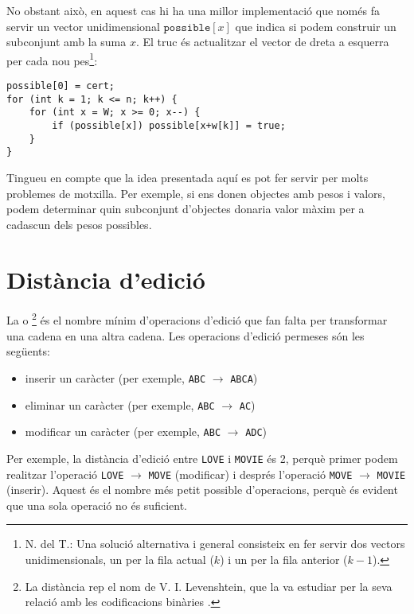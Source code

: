 No obstant això, en aquest cas
hi ha una millor implementació que només fa servir
un vector unidimensional $\texttt{possible}[x]$
que indica si podem construir un subconjunt amb la suma $x$.
El truc és actualitzar el vector de dreta a esquerra
per cada nou pes\footnote{N. del T.: Una solució alternativa i general consisteix
en fer servir dos vectors unidimensionals, un per la fila actual ($k$) i un per la
fila anterior ($k-1$).}:
\begin{lstlisting}
possible[0] = cert;
for (int k = 1; k <= n; k++) {
    for (int x = W; x >= 0; x--) {
        if (possible[x]) possible[x+w[k]] = true;
    }
}
\end{lstlisting}

Tingueu en compte que la idea presentada aquí es pot fer servir per
molts problemes de motxilla.
Per exemple, si ens donen objectes amb pesos i valors,
podem determinar quin subconjunt d'objectes donaria valor màxim
per a cadascun dels pesos possibles.

\section{Distància d'edició}


La  o \footnote{La distància
rep el nom de V. I. Levenshtein, que la va estudiar per la seva relació amb les
codificacions binàries \cite{lev66}.}
és el nombre mínim d'operacions d'edició
que fan falta per transformar una cadena
en una altra cadena.
Les operacions d'edició permeses són les següents:
\begin{itemize}
\item inserir un caràcter (per exemple, \texttt{ABC} $\rightarrow$ \texttt{ABCA})
\item eliminar un caràcter (per exemple, \texttt{ABC} $\rightarrow$ \texttt{AC})
\item modificar un caràcter (per exemple, \texttt{ABC} $\rightarrow$ \texttt{ADC})
\end{itemize}

Per exemple, la distància d'edició entre
\texttt{LOVE} i \texttt{MOVIE} és 2,
perquè primer podem realitzar l'operació
 \texttt{LOVE} $\rightarrow$ \texttt{MOVE}
(modificar) i després l'operació
\texttt{MOVE} $\rightarrow$ \texttt{MOVIE}
(inserir).
Aquest és el nombre més petit possible d'operacions,
perquè és evident que una sola operació no és suficient.

